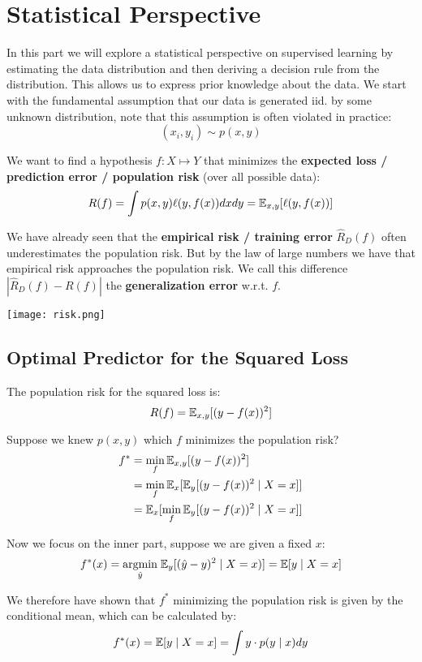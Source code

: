 \section{Statistical Perspective}

In this part we will explore a statistical perspective on supervised learning by estimating the data distribution and then deriving a decision rule from the distribution. This allows us to express prior knowledge about the data. We start with the fundamental assumption that our data is generated iid. by some unknown distribution, note that this assumption is often violated in practice:
$$(x_i, y_i) \sim p(x, y)$$

We want to find a hypothesis $f: X \mapsto Y$ that minimizes the \textbf{expected loss / prediction error / population risk} (over all possible data):
$$R(f) = \int p(x,y) \ell(y, f(x)) dxdy = \mathbb{E}_{x,y}[\ell(y, f(x))]$$

We have already seen that the \textbf{empirical risk / training error} $\hat{R}_D(f)$ often underestimates the population risk. But by the law of large numbers we have that empirical risk approaches the population risk. We call this difference $|\hat{R}_D(f) - R(f)|$ the \textbf{generalization error} w.r.t. $f$.

\texttt{[image: risk.png]}

\subsection{Optimal Predictor for the Squared Loss}

The population risk for the squared loss is:
$$R(f) = \mathbb{E}_{x,y}[(y - f(x))^2]$$

Suppose we knew $p(x,y)$ which $f$ minimizes the population risk?
\begin{align*}
	f^* &= \min_f \mathbb{E}_{x,y}[(y - f(x))^2] \\
	&= \min_f \mathbb{E}_x[\mathbb{E}_y[(y - f(x))^2 \; | \; X=x]] \\
	&= \mathbb{E}_x[ \min_f \mathbb{E}_y[(y - f(x))^2 \; | \; X=x]]
\end{align*}

Now we focus on the inner part, suppose we are given a fixed $x$:
$$f^*(x) = \underset{\hat{y}}{\text{argmin}} \; \mathbb{E}_y[(\hat{y} - y)^2 \; | \; X = x)] = \mathbb{E}[y \; | \; X = x]$$

We therefore have shown that $f^*$ minimizing the population risk is given by the conditional mean, which can be calculated by:
$$f^*(x) = \mathbb{E}[y \; | \; X = x] = \int y \cdot p(y \; | \; x) dy$$

